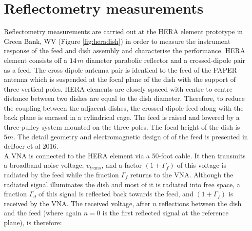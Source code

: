 \documentclass[twocolumn]{emulateapj}
\newcommand{\volt}{{v}}
\begin{document}
\section{\textbf{Reflectometry measurements}} 

Reflectometry measurements are carried out at the HERA element prototype in
Green Bank, WV (Figure \ref{fig:heradish}) in order to measure the instrument
response of the feed and dish assembly and characterise the performance.  HERA
element consists off a $14\,m$ diameter parabolic reflector and a
crossed-dipole pair as a feed. The cross dipole antenna pair is identical to
the feed of the PAPER antenna which is suspended at the focal plane of the dish
with the support of three vertical poles. HERA elements are closely spaced with
centre to centre distance between two dishes are equal to the dish diameter.
Therefore, to reduce the coupling between the adjacent dishes, the crossed
dipole feed along with the back plane is encased in a cylindrical cage. The
feed is raised and lowered by a three-pulley system mounted on the three poles.
The focal height of the dish is $5m$.  The detail geometry and electromagnetic
design of of the feed is presented in deBoer et al 2016. \\


 A VNA is connected to the HERA element via a 50-foot cable. It then transmits
a broadband noise voltage, $\volt_{trans}$, and a factor $(1+\Gamma_f)$ of this
voltage is radiated by the feed while the fraction $\Gamma_{f}$ returns to the
VNA. Although the radiated signal illuminates the dish and most of it is
radiated into free space, a fraction $\Gamma_d$ of this signal is reflected
back towards the feed, and $(1+\Gamma_f)$ is received by the VNA.  The received
voltage, after $n$ reflections between the dish and the feed (where again $n=0$
is the first reflected signal at the reference plane), is therefore:
\end{document}
